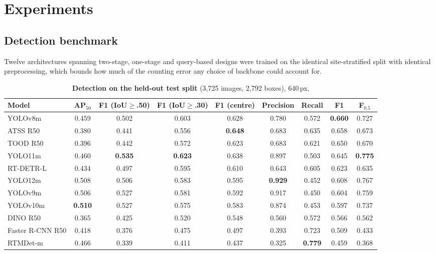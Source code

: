 \section{Experiments}
\label{sec:experiments}

\subsection{Detection benchmark}
\label{sec:detection}

Twelve architectures spanning two-stage, one-stage and query-based designs were trained on
the identical site-stratified split with identical preprocessing, which bounds how much of
the counting error any choice of backbone could account for.

\begin{table}[t]
\centering\small
\setlength{\tabcolsep}{4.5pt}
\begin{tabular}{lcccccccc}
\toprule
Model & AP$_{50}$ & F1 (IoU$\geq$.50) & F1 (IoU$\geq$.30) & F1 (centre) & Precision & Recall & F1 & F$_{0.5}$ \\
\midrule
YOLOv8m & 0.459 & 0.502 & 0.603 & 0.628 & 0.780 & 0.572 & \textbf{0.660} & 0.727 \\
ATSS R50 & 0.380 & 0.441 & 0.556 & \textbf{0.648} & 0.683 & 0.635 & 0.658 & 0.673 \\
TOOD R50 & 0.396 & 0.442 & 0.572 & 0.623 & 0.683 & 0.621 & 0.650 & 0.670 \\
YOLO11m & 0.460 & \textbf{0.535} & \textbf{0.623} & 0.638 & 0.897 & 0.503 & 0.645 & \textbf{0.775} \\
RT-DETR-L & 0.434 & 0.497 & 0.595 & 0.610 & 0.643 & 0.605 & 0.623 & 0.635 \\
YOLO12m & 0.508 & 0.506 & 0.583 & 0.595 & \textbf{0.929} & 0.452 & 0.608 & 0.767 \\
YOLOv9m & 0.506 & 0.527 & 0.581 & 0.592 & 0.917 & 0.450 & 0.604 & 0.759 \\
YOLOv10m & \textbf{0.510} & 0.527 & 0.575 & 0.583 & 0.874 & 0.453 & 0.597 & 0.737 \\
DINO R50 & 0.365 & 0.425 & 0.520 & 0.548 & 0.560 & 0.572 & 0.566 & 0.562 \\
Faster R-CNN R50 & 0.418 & 0.376 & 0.475 & 0.497 & 0.393 & 0.723 & 0.509 & 0.433 \\
RTMDet-m & 0.466 & 0.339 & 0.411 & 0.437 & 0.325 & \textbf{0.779} & 0.459 & 0.368 \\
\bottomrule
\end{tabular}
\caption{\textbf{Detection on the held-out test split} (3,725 images, 2,792 boxes), 640\,px,
}
\end{table}
